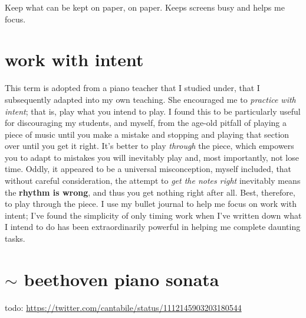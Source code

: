 \documentclass[]{book}
\begin{document}
Keep what can be kept on paper, on paper. Keeps screens busy and helps me focus.

\hypertarget{work-with-intent}{%
\section{work with intent}\label{work-with-intent}}

This term is adopted from a piano teacher that I studied under, that I subsequently adapted into my own teaching. She encouraged me to \emph{practice with intent}; that is, play what you intend to play. I found this to be particularly useful for discouraging my students, and myself, from the age-old pitfall of playing a piece of music until you make a mistake and stopping and playing that section over until you get it right. It's better to play \emph{through} the piece, which empowers you to adapt to mistakes you will inevitably play and, most importantly, not lose time. Oddly, it appeared to be a universal misconception, myself included, that without careful consideration, the attempt to \emph{get the notes right} inevitably means the \textbf{rhythm is wrong}, and thus you get nothing right after all. Best, therefore, to play through the piece. I use my bullet journal to help me focus on work with intent; I've found the simplicity of only timing work when I've written down what I intend to do has been extraordinarily powerful in helping me complete daunting tasks.

\hypertarget{sim-beethoven-piano-sonata}{%
\section{\texorpdfstring{\(\sim\) beethoven piano sonata}{\textbackslash{}sim beethoven piano sonata}}\label{sim-beethoven-piano-sonata}}

todo:
\url{https://twitter.com/cantabile/status/1112145903203180544}


\end{document}
